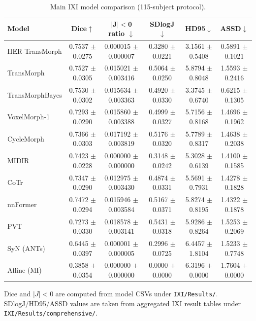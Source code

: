 \documentclass[jimaging,article,submit,pdftex,moreauthors]{Definitions/mdpi}
\begin{document}
\begin{table}[H]
\caption{Main IXI model comparison (115-subject protocol).\label{tab2}}
\centering
\scriptsize
\setlength{\tabcolsep}{3pt}
\begin{tabularx}{\textwidth}{lccccc}
\toprule
\textbf{Model} & \textbf{Dice\(\uparrow\)} & \(\boldsymbol{|J|<0}\) \textbf{ratio \(\downarrow\)} & \textbf{SDlogJ\(\downarrow\)} & \textbf{HD95\(\downarrow\)} & \textbf{ASSD\(\downarrow\)}\\
\midrule
HER-TransMorph & 0.7537 \(\pm\) 0.0275 & 0.000015 \(\pm\) 0.000007 & 0.3280 \(\pm\) 0.0221 & 3.1561 \(\pm\) 0.5408 & 0.5891 \(\pm\) 0.1021\\
TransMorph & 0.7527 \(\pm\) 0.0305 & 0.015021 \(\pm\) 0.003416 & 0.5064 \(\pm\) 0.0250 & 5.8794 \(\pm\) 0.8048 & 1.5593 \(\pm\) 0.2416\\
TransMorphBayes & 0.7530 \(\pm\) 0.0302 & 0.015634 \(\pm\) 0.003363 & 0.4920 \(\pm\) 0.0330 & 3.3745 \(\pm\) 0.6740 & 0.6215 \(\pm\) 0.1305\\
VoxelMorph-1 & 0.7293 \(\pm\) 0.0290 & 0.015860 \(\pm\) 0.003388 & 0.4999 \(\pm\) 0.0327 & 5.7156 \(\pm\) 0.8168 & 1.4696 \(\pm\) 0.1962\\
CycleMorph & 0.7366 \(\pm\) 0.0303 & 0.017192 \(\pm\) 0.003819 & 0.5176 \(\pm\) 0.0320 & 5.7789 \(\pm\) 0.8317 & 1.4638 \(\pm\) 0.2038\\
MIDIR & 0.7423 \(\pm\) 0.0228 & 0.000000 \(\pm\) 0.000000 & 0.3148 \(\pm\) 0.0242 & 5.3028 \(\pm\) 0.6139 & 1.4100 \(\pm\) 0.1585\\
CoTr & 0.7347 \(\pm\) 0.0290 & 0.012975 \(\pm\) 0.003430 & 0.4874 \(\pm\) 0.0331 & 5.5691 \(\pm\) 0.7931 & 1.4278 \(\pm\) 0.1828\\
nnFormer & 0.7472 \(\pm\) 0.0294 & 0.015946 \(\pm\) 0.003584 & 0.5167 \(\pm\) 0.0371 & 5.8274 \(\pm\) 0.8195 & 1.4322 \(\pm\) 0.1878\\
PVT & 0.7273 \(\pm\) 0.0330 & 0.018578 \(\pm\) 0.003141 & 0.5431 \(\pm\) 0.0318 & 5.9286 \(\pm\) 0.8264 & 1.5253 \(\pm\) 0.2069\\
SyN (ANTs) & 0.6445 \(\pm\) 0.0397 & 0.000001 \(\pm\) 0.000005 & 0.2996 \(\pm\) 0.0725 & 6.4457 \(\pm\) 1.8104 & 1.5233 \(\pm\) 0.7748\\
Affine (MI) & 0.3858 \(\pm\) 0.0354 & 0.000000 \(\pm\) 0.000000 & 0.0000 \(\pm\) 0.0000 & 6.3196 \(\pm\) 0.0000 & 1.7604 \(\pm\) 0.0000\\
\bottomrule
\end{tabularx}
\parbox{\textwidth}{\footnotesize Dice and \(|J|<0\) are computed from model CSVs under \texttt{IXI/Results/}. SDlogJ/HD95/ASSD values are taken from aggregated IXI result tables under \texttt{IXI/Results/comprehensive/}.}
\end{table}
\end{document}
